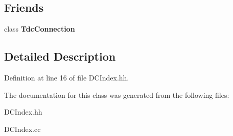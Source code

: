 \subsection*{Friends}
\begin{DoxyCompactItemize}
\item 
class {\bfseries Tdc\-Connection}\label{classCALICE_1_1DCIndex_ab85618aade64e98c6f7945f78e721566}

\end{DoxyCompactItemize}


\subsection{Detailed Description}


Definition at line 16 of file D\-C\-Index.\-hh.



The documentation for this class was generated from the following files\-:\begin{DoxyCompactItemize}
\item 
D\-C\-Index.\-hh\item 
D\-C\-Index.\-cc\end{DoxyCompactItemize}
